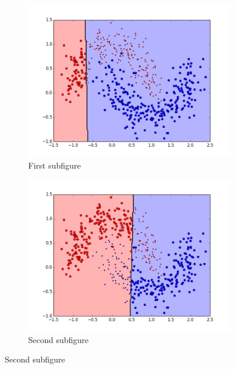 \begin{figure}[t!] %
\begin{subfigure}{0.48\textwidth}
\includegraphics[width=\linewidth]{figs/Banana/2All-Classifiers}
\caption{First subfigure} \label{fig:Banana_all_single_a}
\end{subfigure}\hspace*{\fill}
\begin{subfigure}{0.48\textwidth}
\includegraphics[width=\linewidth]{figs/Banana/12All-Classifiers}
\caption{Second subfigure} \label{fig:Banana_all_single_b}
\end{subfigure}


\end{figure}
